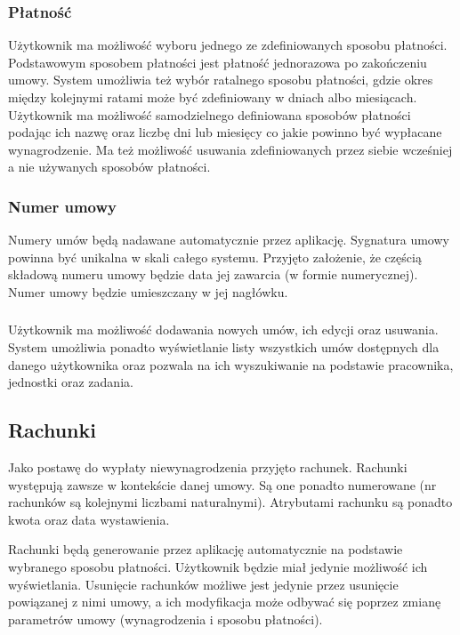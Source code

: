 \subsubsection{Płatność}
Użytkownik ma możliwość wyboru jednego ze zdefiniowanych sposobu płatności. Podstawowym sposobem płatności jest płatność jednorazowa po zakończeniu umowy. System umożliwia też wybór ratalnego sposobu płatności, gdzie okres między kolejnymi ratami może być zdefiniowany w dniach albo miesiącach. Użytkownik ma możliwość samodzielnego definiowana sposobów płatności podając ich nazwę oraz liczbę dni lub miesięcy co jakie powinno być wypłacane wynagrodzenie. Ma też możliwość usuwania zdefiniowanych przez siebie wcześniej a nie używanych sposobów płatności. 

\subsubsection{Numer umowy}
Numery umów będą nadawane automatycznie przez aplikację. Sygnatura umowy powinna być unikalna w skali całego systemu. Przyjęto założenie, że częścią składową numeru umowy będzie data jej zawarcia (w formie numerycznej). Numer umowy będzie umieszczany w jej nagłówku.

\subsubsection{}
Użytkownik ma możliwość dodawania nowych umów, ich edycji oraz usuwania. System umożliwia ponadto wyświetlanie listy wszystkich umów dostępnych dla danego użytkownika oraz pozwala na ich wyszukiwanie na podstawie pracownika, jednostki oraz zadania.

\subsection[Rachunki][Rachunki]{Rachunki}
Jako postawę do wypłaty niewynagrodzenia przyjęto rachunek. Rachunki występują zawsze w kontekście danej umowy. Są one ponadto numerowane (nr rachunków są kolejnymi liczbami naturalnymi). Atrybutami rachunku są ponadto kwota oraz data wystawienia.

Rachunki będą generowanie przez aplikację automatycznie na podstawie wybranego sposobu płatności. Użytkownik będzie miał jedynie możliwość ich wyświetlania. Usunięcie rachunków możliwe jest jedynie przez usunięcie powiązanej z nimi umowy, a ich modyfikacja może odbywać się poprzez zmianę parametrów umowy (wynagrodzenia i sposobu płatności).

